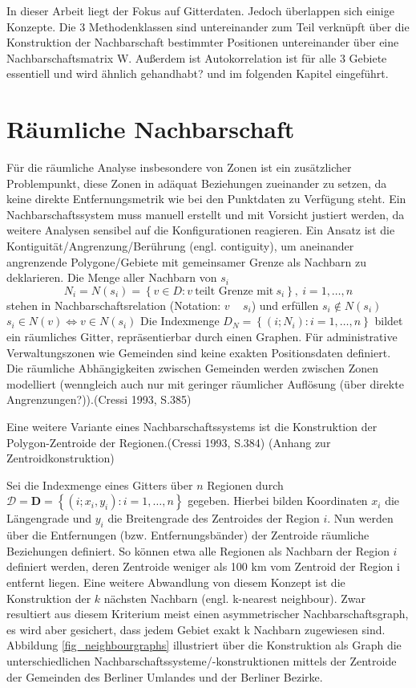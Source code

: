 In dieser Arbeit liegt der Fokus auf Gitterdaten. Jedoch überlappen sich einige Konzepte. 
Die 3 Methodenklassen sind untereinander zum Teil verknüpft über die Konstruktion der Nachbarschaft bestimmter Positionen untereinander über 
eine Nachbarschaftsmatrix W. Außerdem ist Autokorrelation ist für alle 3 Gebiete essentiell und wird ähnlich gehandhabt? und im folgenden Kapitel eingeführt.

\section{Räumliche Nachbarschaft}
Für die räumliche Analyse insbesondere von Zonen ist ein zusätzlicher Problempunkt, diese Zonen in adäquat Beziehungen zueinander zu setzen, da keine direkte Entfernungsmetrik wie bei
den Punktdaten zu Verfügung steht. Ein Nachbarschaftssystem muss manuell erstellt und mit Vorsicht justiert werden, da weitere Analysen sensibel auf die Konfigurationen reagieren.
Ein Ansatz ist die Kontiguität/Angrenzung/Berührung (engl. contiguity), um aneinander angrenzende Polygone/Gebiete mit gemeinsamer Grenze als Nachbarn zu deklarieren. 
Die Menge aller Nachbarn von $s_i$
\begin{equation*}
    N_i = N(s_i)=\left\{ v \in D: v ~ \text{teilt Grenze mit} ~ s_i \right\} , ~ i=1,…,n    
\end{equation*}
stehen in Nachbarschaftsrelation (Notation: $v$ ~ $s_i$) und erfüllen 
$s_i \notin N(s_i)$
$s_i  \in N(v) \Leftrightarrow v \in N(s_i)$
Die Indexmenge
$D_N= \left\{ (i; N_i):i=1,\ldots,n  \right\} $
bildet ein räumliches Gitter, repräsentierbar durch einen Graphen. 
Für administrative Verwaltungszonen wie Gemeinden sind keine exakten Positionsdaten definiert. Die räumliche Abhängigkeiten zwischen Gemeinden werden zwischen Zonen modelliert 
(wenngleich auch nur mit geringer räumlicher Auflösung (über direkte Angrenzungen?)).(Cressi 1993, S.385)

Eine weitere Variante eines Nachbarschaftssystems ist die Konstruktion der Polygon-Zentroide der Regionen.(Cressi 1993, S.384) (Anhang zur Zentroidkonstruktion)

Sei die Indexmenge eines Gitters über $n$ Regionen durch $ \mathcal{D} =  \mathbf{D} =\left\{  \left({i;x_i,y_i} \right):i=1,\ldots,n \right\}$
gegeben. Hierbei bilden Koordinaten $x_i$ die Längengrade und $y_i$ die Breitengrade des Zentroides der Region $i$. 
Nun werden über die Entfernungen (bzw. Entfernungsbänder) der Zentroide räumliche Beziehungen definiert. 
So können etwa alle Regionen als Nachbarn der Region $i$ definiert werden, deren Zentroide weniger als 100 km vom Zentroid der Region i entfernt liegen.
Eine weitere Abwandlung von diesem Konzept ist die Konstruktion der $k$ nächsten Nachbarn (engl. k-nearest neighbour). 
Zwar resultiert aus diesem Kriterium meist einen asymmetrischer Nachbarschaftsgraph, es wird aber gesichert, dass jedem Gebiet exakt k Nachbarn zugewiesen sind.
Abbildung \ref{fig_neighbourgraphs} illustriert über die Konstruktion als Graph die unterschiedlichen 
Nachbarschaftssysteme/-konstruktionen mittels der Zentroide 
der Gemeinden des Berliner Umlandes und der Berliner Bezirke.

